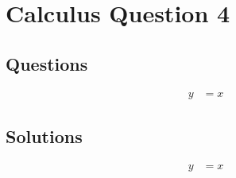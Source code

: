 \chapter{Calculus Question 4}
\label{chap:cq4}

\section{Questions}
\label{sec:cq4q}
\begin{align}
  y &= x
\end{align}

\section{Solutions}
\label{sec:cq4s}
\begin{align}
  y &= x
\end{align}